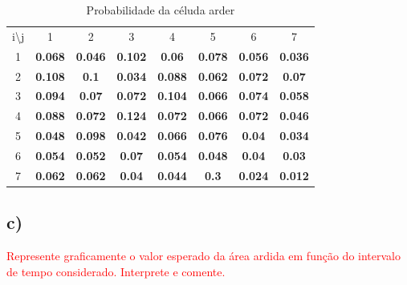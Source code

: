 \documentclass[11pt]{article} %
\begin{document}
\begin{table}[]
\centering
\begin{tabular}{cccccccc}
i\textbackslash{}j     & 1                                   & 2                                   & 3                                   & 4                                   & 5                                   & 6                                   & 7                                   \\ \cline{2-8}
\multicolumn{1}{c|}{1} & \multicolumn{1}{c|}{\textbf{0.068}} & \multicolumn{1}{c|}{\textbf{0.046}} & \multicolumn{1}{c|}{\textbf{0.102}} & \multicolumn{1}{c|}{\textbf{0.06}}  & \multicolumn{1}{c|}{\textbf{0.078}} & \multicolumn{1}{c|}{\textbf{0.056}} & \multicolumn{1}{c|}{\textbf{0.036}} \\ \cline{2-8}
\multicolumn{1}{c|}{2} & \multicolumn{1}{c|}{\textbf{0.108}} & \multicolumn{1}{c|}{\textbf{0.1}}   & \multicolumn{1}{c|}{\textbf{0.034}} & \multicolumn{1}{c|}{\textbf{0.088}} & \multicolumn{1}{c|}{\textbf{0.062}} & \multicolumn{1}{c|}{\textbf{0.072}} & \multicolumn{1}{c|}{\textbf{0.07}}  \\ \cline{2-8}
\multicolumn{1}{c|}{3} & \multicolumn{1}{c|}{\textbf{0.094}} & \multicolumn{1}{c|}{\textbf{0.07}}  & \multicolumn{1}{c|}{\textbf{0.072}} & \multicolumn{1}{c|}{\textbf{0.104}} & \multicolumn{1}{c|}{\textbf{0.066}} & \multicolumn{1}{c|}{\textbf{0.074}} & \multicolumn{1}{c|}{\textbf{0.058}} \\ \cline{2-8}
\multicolumn{1}{c|}{4} & \multicolumn{1}{c|}{\textbf{0.088}} & \multicolumn{1}{c|}{\textbf{0.072}} & \multicolumn{1}{c|}{\textbf{0.124}} & \multicolumn{1}{c|}{\textbf{0.072}} & \multicolumn{1}{c|}{\textbf{0.066}} & \multicolumn{1}{c|}{\textbf{0.072}} & \multicolumn{1}{c|}{\textbf{0.046}} \\ \cline{2-8}
\multicolumn{1}{c|}{5} & \multicolumn{1}{c|}{\textbf{0.048}} & \multicolumn{1}{c|}{\textbf{0.098}} & \multicolumn{1}{c|}{\textbf{0.042}} & \multicolumn{1}{c|}{\textbf{0.066}} & \multicolumn{1}{c|}{\textbf{0.076}} & \multicolumn{1}{c|}{\textbf{0.04}}  & \multicolumn{1}{c|}{\textbf{0.034}} \\ \cline{2-8}
\multicolumn{1}{c|}{6} & \multicolumn{1}{c|}{\textbf{0.054}} & \multicolumn{1}{c|}{\textbf{0.052}} & \multicolumn{1}{c|}{\textbf{0.07}}  & \multicolumn{1}{c|}{\textbf{0.054}} & \multicolumn{1}{c|}{\textbf{0.048}} & \multicolumn{1}{c|}{\textbf{0.04}}  & \multicolumn{1}{c|}{\textbf{0.03}}  \\ \cline{2-8}
\multicolumn{1}{c|}{7} & \multicolumn{1}{c|}{\textbf{0.062}} & \multicolumn{1}{c|}{\textbf{0.062}} & \multicolumn{1}{c|}{\textbf{0.04}}  & \multicolumn{1}{c|}{\textbf{0.044}} & \multicolumn{1}{c|}{\textbf{0.3}}   & \multicolumn{1}{c|}{\textbf{0.024}} & \multicolumn{1}{c|}{\textbf{0.012}} \\ \cline{2-8}
\end{tabular}
\caption{Probabilidade da céluda arder}
\end{table}

\subsection*{c)}
\textcolor{red}{Represente graficamente o valor esperado da área ardida em função do intervalo
de tempo considerado. Interprete e comente.}
\end{document}

